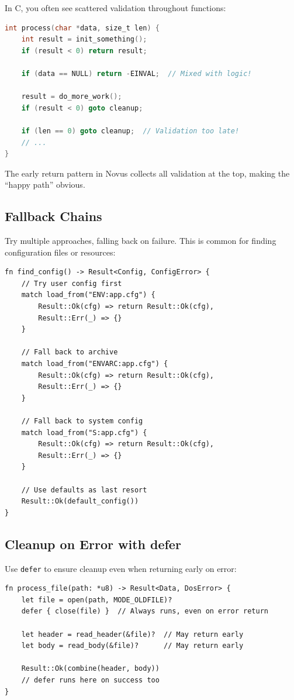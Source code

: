 \begin{comingfromc}
In C, you often see scattered validation throughout functions:

\begin{lstlisting}[language=C]
int process(char *data, size_t len) {
    int result = init_something();
    if (result < 0) return result;

    if (data == NULL) return -EINVAL;  // Mixed with logic!

    result = do_more_work();
    if (result < 0) goto cleanup;

    if (len == 0) goto cleanup;  // Validation too late!
    // ...
}
\end{lstlisting}

The early return pattern in Novus collects all validation at the top, making the ``happy path'' obvious.
\end{comingfromc}

\subsection{Fallback Chains}

Try multiple approaches, falling back on failure. This is common for finding configuration files or resources:

\begin{lstlisting}
fn find_config() -> Result<Config, ConfigError> {
    // Try user config first
    match load_from("ENV:app.cfg") {
        Result::Ok(cfg) => return Result::Ok(cfg),
        Result::Err(_) => {}
    }

    // Fall back to archive
    match load_from("ENVARC:app.cfg") {
        Result::Ok(cfg) => return Result::Ok(cfg),
        Result::Err(_) => {}
    }

    // Fall back to system config
    match load_from("S:app.cfg") {
        Result::Ok(cfg) => return Result::Ok(cfg),
        Result::Err(_) => {}
    }

    // Use defaults as last resort
    Result::Ok(default_config())
}
\end{lstlisting}

\subsection{Cleanup on Error with defer}

Use \texttt{defer} to ensure cleanup even when returning early on error:

\begin{lstlisting}
fn process_file(path: *u8) -> Result<Data, DosError> {
    let file = open(path, MODE_OLDFILE)?
    defer { close(file) }  // Always runs, even on error return

    let header = read_header(&file)?  // May return early
    let body = read_body(&file)?      // May return early

    Result::Ok(combine(header, body))
    // defer runs here on success too
}
\end{lstlisting}

